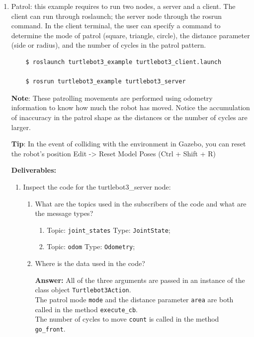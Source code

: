 \documentclass[12pt]{article}
\begin{document}
\begin{enumerate}
\begin{enumerate}
  \end{enumerate}

  \item Patrol: this example requires to run two nodes, a server and a client. The client can run through roslaunch; the server node through the rosrun command. In the client terminal, the user can specify a command to determine the mode of patrol (square, triangle, circle), the distance parameter (side or radius), and the number of cycles in the patrol pattern.

  \begin{verbatim}
    $ roslaunch turtlebot3_example turtlebot3_client.launch

    $ rosrun turtlebot3_example turtlebot3_server
  \end{verbatim}

  \textbf{Note}: These patrolling movements are performed using odometry information to know how much the robot has moved. Notice the accumulation of inaccuracy in the patrol shape as the distances or the number of cycles are larger.

  \textbf{Tip}: In the event of colliding with the environment in Gazebo, you can reset the robot’s position Edit -> Reset Model Poses (Ctrl + Shift + R)

  \textbf{Deliverables:}
  
  \begin{enumerate}

    \item Inspect the code for the turtlebot3\_server node:
    
    \begin{enumerate}
    
      \item What are the topics used in the subscribers of the code and what are the message types?
    
        \begin{enumerate}
          \item Topic: \texttt{joint_states} Type: \texttt{JointState};
          \item Topic: \texttt{odom} Type: \texttt{Odometry};
        \end{enumerate}

      \item Where is the data used in the code?
    
      \textbf{Answer: }All of the three arguments are passed in an instance of the class object \texttt{Turtlebot3Action}.
      \\The patrol mode \texttt{mode} and the distance parameter \texttt{area} are both called in the method \texttt{execute_cb}.
      \\The number of cycles to move \texttt{count} is called in the method \texttt{go_front}.


\end{enumerate}
\end{enumerate}
\end{enumerate}
\end{document}
